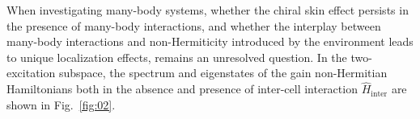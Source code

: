 \documentclass[longbibliography, aps, prx, amsmath, amssymb, amsfonts, twocolumn,superscriptaddress, footinbib]{revtex4-1}
\begin{document}

	
	When investigating many-body systems, whether the chiral skin effect persists in the presence of many-body interactions, and whether the interplay between many-body interactions and non-Hermiticity introduced by the environment leads to unique localization effects, remains an unresolved question. In the two-excitation subspace, the spectrum and eigenstates of the gain non-Hermitian Hamiltonians both in the absence and presence of inter-cell interaction $\hat{H}_{\text{inter}}$ are shown in Fig.~\ref{fig:02}.

	
\end{document}
